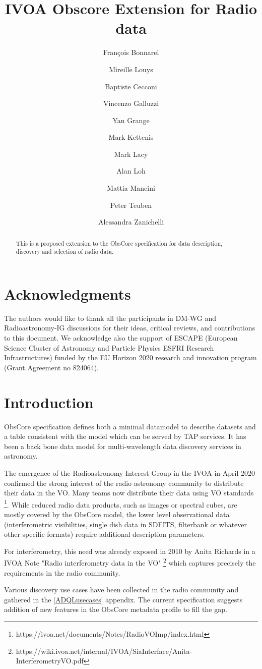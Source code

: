 \documentclass[11pt,a4paper]{ivoa}
\title{IVOA Obscore Extension for Radio data}
\author{Fran\c cois Bonnarel}
\author{Mireille Louys}
\author{Baptiste Cecconi}
\author{Vincenzo Galluzzi}
\author{Yan Grange}
\author{Mark Kettenis}
\author{Mark Lacy}
\author{Alan Loh}
\author{Mattia Mancini}
\author{Peter Teuben}
\author{Alessandra Zanichelli}
\begin{document}
\begin{abstract}
This is a proposed extension to the ObsCore specification for data description, discovery and selection of radio data.
\end{abstract}

\section*{Acknowledgments}

The authors would like to thank all the participants in DM-WG and Radioastronomy-IG discussions 
for their ideas, critical reviews, and contributions to this document.
We acknowledge also the support of  ESCAPE (European Science Cluster of Astronomy
and Particle Physics ESFRI Research Infrastructures) funded by the EU Horizon
2020 research and innovation program (Grant Agreement no 824064).

\section{Introduction}


ObsCore specification \citep{2017ivoa.spec.0509L} defines both a minimal datamodel to describe datasets 
and a table consistent with the model which can be served by TAP services. It has been a back bone data model 
for  multi-wavelength data discovery services in astronomy.

The emergence  of  the Radioastronomy Interest Group in the IVOA in April 2020 confirmed the strong 
interest of the radio astronomy community to distribute their data in the VO. Many teams now 
distribute their data using VO standards \footnote{https://ivoa.net/documents/Notes/RadioVOImp/index.html}. 
While reduced radio data products, such as images or spectral cubes,%
are mostly covered by the ObsCore model, the lower level observational data 
(interferometric visibilities, single dish data in SDFITS, filterbank or whatever other specific formats) require 
additional description parameters. 

For interferometry, this need  was already exposed 
in 2010 by Anita Richards in a IVOA Note  "Radio interferometry data in the VO" 
\footnote{https://wiki.ivoa.net/internal/IVOA/SiaInterface/Anita-InterferometryVO.pdf} which captures precisely the requirements in the radio community.
 
 Various discovery use cases have been collected in the radio community and gathered in the \ref{ADQLusecases} appendix.  
  The current specification suggests addition of new features in the ObsCore metadata profile to fill the gap. 
\end{document}
